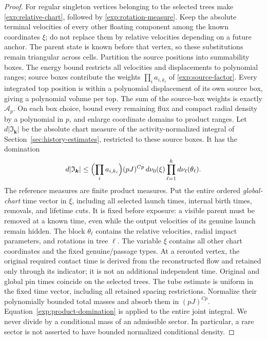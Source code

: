 \begin{proof}
For regular singleton vertices belonging to the selected trees make
\eqref{exp:relative-chart}, followed by \eqref{exp:rotation-measure}.
Keep the absolute terminal velocities of every other floating component
among the known coordinates $\xi$; do not replace them by relative
velocities depending on a future anchor.  The parent state is known before that vertex,
so these substitutions remain triangular across cells.  Partition the
source positions into summability boxes.  The energy bound restricts all
velocities and displacements to polynomial ranges; source boxes contribute the weights $\prod_i a_{i,k_i}$ of
\eqref{exp:source-factor}.  Every integrated top position is within a
polynomial displacement of its own source box, giving a polynomial volume
per top.  The sum of the source-box weights is exactly $\mathcal A_p$.  On each box
choice, bound every remaining flux and compact radial density by a
polynomial in $p$, and enlarge coordinate domains to product ranges.
Let $d|\mathfrak I_{\boldsymbol k}|$ be the absolute chart measure of
the activity-normalized integral of Section~\ref{sec:history-estimates},
restricted to these source boxes.
It has the domination
\begin{equation}
\label{exp:product-domination}
 d|\mathfrak I_{\boldsymbol k}|\le
 \Bigl(\prod_i a_{i,k_i}\Bigr)(pJ)^{Cp}\,d\nu_0(\xi)
                    \prod_{\ell=1}^k d\nu_\ell(\theta_\ell).
\end{equation}
The reference measures are finite product measures.  Put the entire
ordered \emph{global-chart} time vector in $\xi$, including all selected launch times, internal
birth times, removals, and lifetime cuts.  It is fixed before exposure:
a visible parent must be removed at a known time, even while the output
velocities of its genuine launch remain hidden.  The block $\theta_\ell$
contains the relative velocities, radial impact parameters, and rotations
in tree $\ell$.  The variable $\xi$ contains all other chart coordinates
and the fixed genuine/passage types.  At a rerouted vertex, the original
required contact time is derived from the reconstructed flow and retained
only through its indicator; it is not an additional independent time.
Original and global pin times coincide on the selected trees.  The tube estimate is uniform in the
fixed time vector, including all retained spacing restrictions.  Normalize their
polynomially bounded total masses and absorb them in $(pJ)^{Cp}$.
Equation~\eqref{exp:product-domination} is applied to the entire joint
integral.  We never divide by a conditional mass of an admissible sector.
In particular, a rare sector is not asserted to have bounded normalized
conditional density.


\end{proof}
